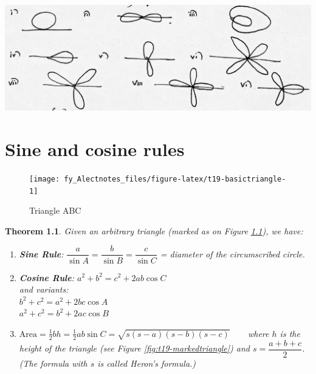 \documentclass[
  12pt,
  oneside]{book}
\newtheorem{theorem}{Theorem}[chapter]
\theoremstyle{definition}
\theoremstyle{definition}
\theoremstyle{definition}
\theoremstyle{definition}
\theoremstyle{remark}
\begin{document}
\begin{center}\includegraphics{t17-curves} \end{center}

\hypertarget{sine-and-cosine-rules}{%
\chapter{Sine and cosine rules}\label{sine-and-cosine-rules}}

\begin{figure}

{\centering \texttt{[image: fy\_Alectnotes\_files/figure-latex/t19-basictriangle-1]} 

}

\caption{Triangle ABC}\label{fig:t19-basictriangle}
\end{figure}

\begin{theorem}

Given an arbitrary triangle (marked as on Figure \ref{fig:t19-basictriangle}), we have:

\begin{enumerate}
\def\labelenumi{\arabic{enumi}.}
\item
  \textbf{Sine Rule}: \(\boxed{\dfrac{a}{\sin A} = \dfrac{b}{\sin B} = \dfrac{c}{\sin C}}\) = diameter of the circumscribed circle.
\item
  \textbf{Cosine Rule}: \(\boxed{a^2+b^2 = c^2 + 2ab\cos C}\)\\
  and variants:\\
  \(b^2+c^2 = a^2 + 2bc\cos A\)\\
  \(a^2+c^2 = b^2 + 2ac\cos B\)
\item
  \(\boxed{\mathrm{Area} = \frac12 bh = \frac12ab\sin C = \sqrt{s(s-a)(s-b)(s-c)}}\) ~ ~ where \(h\) is the \emph{height} of the triangle (see Figure \ref{fig:t19-markedtriangle}) and \(s=\dfrac{a+b+c}{2}\).\\
  (The formula with \(s\) is called \emph{Heron's formula}.)
\end{enumerate}

\end{theorem}
\end{document}
